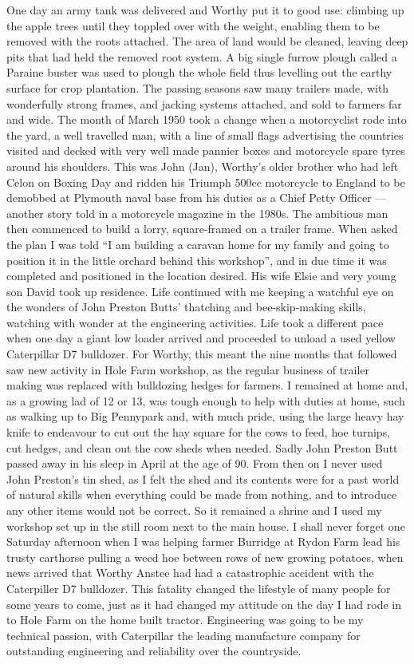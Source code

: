 
One day an army tank was delivered and Worthy put it to good use: climbing up
the apple trees until they toppled over with the weight, enabling them to be
removed with the roots attached. The area of land would be cleaned, leaving
deep pits that had held the removed root system. A big single furrow plough
called a Paraine buster was used to plough the whole field thus levelling out
the earthy surface for crop plantation. The passing seasons saw many trailers
made, with wonderfully strong frames, and jacking systems attached, and sold to
farmers far and wide. The month of March 1950 took a change when a motorcyclist
rode into the yard, a well travelled man, with a line of small flags
advertising the countries visited and decked with very well made pannier boxes
and motorcycle spare tyres around his shoulders. This was John (Jan), Worthy's
older brother who had left Celon on Boxing Day and ridden his Triumph 500cc
motorcycle to England to be demobbed at Plymouth naval base from his duties as
a Chief Petty Officer --- another story told in a motorcycle magazine in the
1980s. The ambitious man then commenced to build a lorry, square-framed on a
trailer frame. When asked the plan I was told ``I am building a caravan home
for my family and going to position it in the little orchard behind this
workshop'', and in due time it was completed and positioned in the location
desired. His wife Elsie and very young son David took up residence. Life
continued with me keeping a watchful eye on the wonders of John Preston Butts'
thatching and bee-skip-making skills, watching with wonder at the engineering
activities. Life took a different pace when one day a giant low loader arrived
and proceeded to unload a used yellow Caterpillar D7 bulldozer. For Worthy,
this meant the nine months that followed saw new activity in Hole Farm
workshop, as the regular business of trailer making was replaced with
bulldozing hedges for farmers. I remained at home and, as a growing lad of 12
or 13, was tough enough to help with duties at home, such as walking up to Big
Pennypark and, with much pride, using the large heavy hay knife to endeavour to
cut out the hay square for the cows to feed, hoe turnips, cut hedges, and clean
out the cow sheds when needed. Sadly John Preston Butt passed away in his sleep
in April at the age of 90. From then on I never used John Preston's tin shed,
as I felt the shed and its contents were for a past world of natural skills
when everything could be made from nothing, and to introduce any other items
would not be correct. So it remained a shrine and I used my workshop set up in
the still room next to the main house. I shall never forget one Saturday
afternoon when I was helping farmer Burridge at Rydon Farm lead his trusty
carthorse pulling a weed hoe between rows of new growing potatoes, when news
arrived that Worthy Anstee had had a catastrophic accident with the Caterpiller
D7 bulldozer. This fatality changed the lifestyle of many people for some years
to come, just as it had changed my attitude on the day I had rode in to Hole
Farm on the home built tractor. Engineering was going to be my technical
passion, with Caterpillar the leading manufacture company for outstanding
engineering and reliability over the countryside.

